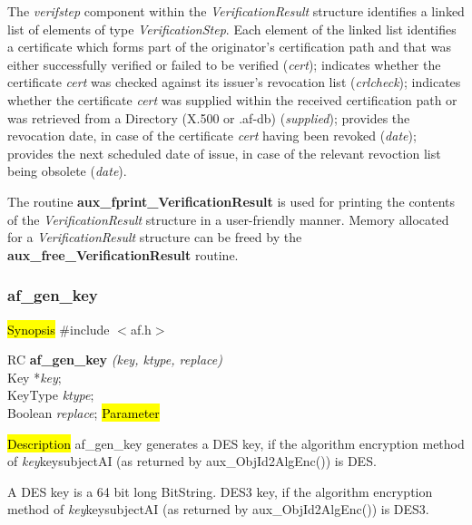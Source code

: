 The {\em verifstep} component within the {\em VerificationResult} structure identifies a 
linked list of elements of type {\em VerificationStep}.
Each element of the linked list
\bi
\m identifies a certificate which forms part of the originator's certification path and
that was either successfully verified or failed to be verified
({\em cert});
\m indicates whether the certificate {\em cert} was checked against its issuer's revocation 
list ({\em crlcheck});
\m indicates whether the certificate {\em cert} was supplied within the received certification
path or was retrieved from a Directory (X.500 or .af-db) ({\em supplied});
\m provides the revocation date, in case of the certificate {\em cert} having been revoked
({\em date});
\m provides the next scheduled date of issue, in case of the relevant revoction list being 
obsolete ({\em date}).
\ei

The routine {\bf aux\_fprint\_VerificationResult} is used for printing the contents of the
{\em VerificationResult} structure in a user-friendly manner. Memory allocated for
a {\em VerificationResult} structure can be freed by the {\bf aux\_free\_VerificationResult}
routine.

\subsubsection{af\_gen\_key}
\label{af_gen_key}
\hl{Synopsis}
\#include $<$af.h$>$

RC {\bf af\_gen\_key} {\em (key, ktype, replace)} \\
Key *{\em key}; \\
KeyType {\em ktype}; \\
Boolean {\em replace};
\hl{Parameter}



\hl{Description}
af\_gen\_key generates a
\bi
\m  DES key, 
    if the algorithm encryption method 
    of {\em key}\pf key\pf subjectAI (as returned by aux\_ObjId2AlgEnc()) is DES.
 
    A DES key is a 64 bit long BitString.
\m  DES3 key, 
    if the algorithm encryption method 
    of {\em key}\pf key\pf subjectAI (as returned by aux\_ObjId2AlgEnc()) is DES3.
 
